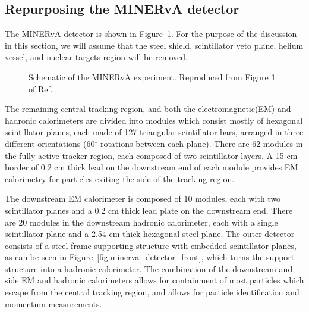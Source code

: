 \subsection{Repurposing the MINERvA detector}
\label{sec:minerva}
The MINERvA detector is shown in Figure~\ref{fig:minerva_detector}. For the purpose of the discussion in this section, we will assume that the steel shield, scintillator veto plane, helium vessel, and nuclear targets region will be removed. 
\begin{figure}[htb]
  \centering
  \caption{Schematic of the MINERvA experiment. Reproduced from Figure 1 of Ref.~\cite{minerva-nim}.}
  \label{fig:minerva_detector}
\end{figure}

The remaining central tracking region, and both the electromagnetic(EM) and hadronic calorimeters are divided into modules which consist mostly of hexagonal scintillator planes, each made of 127 triangular scintillator bars, arranged in three different orientations (60$^\circ$ rotations between each plane). There are 62 modules in the fully-active tracker region, each composed of two scintillator layers. A 15 cm border of 0.2 cm thick lead on the downstream end of each module provides EM calorimetry for particles exiting the side of the tracking region.

The downstream EM calorimeter is composed of 10 modules, each with two scintillator planes and a 0.2 cm thick lead plate on the downstream end. There are 20 modules in the downstream hadronic calorimeter, each with a single scintillator plane and a 2.54 cm thick hexagonal steel plane. The outer detector consists of a steel frame supporting structure with embedded scintillator planes, as can be seen in Figure~\ref{fig:minerva_detector_front}, which turns the support structure into a hadronic calorimeter. The combination of the downstream and side EM and hadronic calorimeters allows for containment of most particles which escape from the central tracking region, and allows for particle identification and momentum measurements.

